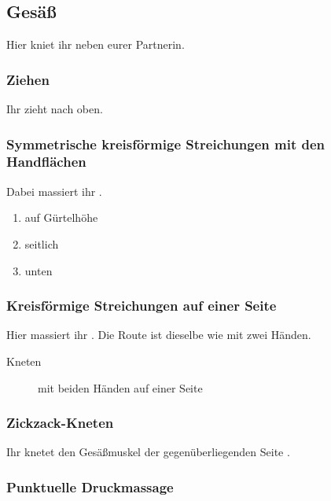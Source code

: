 \subsection{Gesäß}

Hier kniet ihr neben eurer Partnerin.

\subsubsection{Ziehen}

Ihr zieht  nach oben.

\subsubsection{Symmetrische kreisförmige Streichungen mit den Handflächen}

Dabei massiert ihr .

\begin{oframed}
  \begin{enumerate}
    \item auf Gürtelhöhe 
    \item seitlich 
    \item unten 
  \end{enumerate}
\end{oframed}

\subsubsection{Kreisförmige Streichungen auf einer Seite}

Hier massiert ihr . Die Route ist dieselbe wie mit zwei Händen.

\begin{description}
  \item [Kneten] mit beiden Händen auf einer Seite
\end{description}


\subsubsection{Zickzack-Kneten}

Ihr knetet den Gesäßmuskel der gegenüberliegenden Seite .


\subsubsection{Punktuelle Druckmassage}

